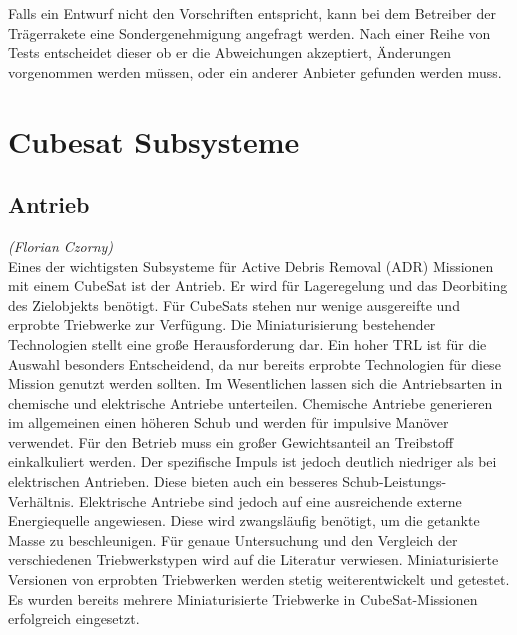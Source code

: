 		Falls ein Entwurf nicht den Vorschriften entspricht, kann bei dem Betreiber der Trägerrakete eine Sondergenehmigung angefragt werden. Nach einer Reihe von Tests entscheidet dieser ob er die Abweichungen akzeptiert, Änderungen vorgenommen werden müssen, oder ein anderer Anbieter gefunden werden muss. \cite{CaliforniaPolytechnicStateUniversity.2014} 

	\section{Cubesat Subsysteme}%
		\subsection{Antrieb}
\hfill\emph{(Florian Czorny)}\\		%

		Eines der wichtigsten Subsysteme für Active Debris Removal (ADR) Missionen mit einem CubeSat ist der Antrieb. Er wird für Lageregelung und das Deorbiting des Zielobjekts benötigt.
Für CubeSats stehen nur wenige ausgereifte und erprobte Triebwerke zur Verfügung.  Die Miniaturisierung bestehender Technologien stellt eine große Herausforderung dar. Ein hoher TRL ist für die Auswahl besonders Entscheidend, da nur bereits erprobte Technologien für diese Mission genutzt werden sollten.
Im Wesentlichen lassen sich die Antriebsarten in chemische und elektrische Antriebe unterteilen.  Chemische Antriebe generieren im allgemeinen einen höheren Schub und werden für impulsive Manöver verwendet. Für den Betrieb muss ein großer Gewichtsanteil an Treibstoff einkalkuliert werden. Der spezifische Impuls ist jedoch deutlich niedriger als bei elektrischen Antrieben. Diese bieten auch ein besseres Schub-Leistungs-Verhältnis. Elektrische Antriebe sind jedoch auf eine ausreichende externe Energiequelle angewiesen. Diese wird zwangsläufig benötigt, um die getankte Masse zu beschleunigen.
Für genaue Untersuchung und den Vergleich der verschiedenen Triebwerkstypen wird auf die Literatur \cite{Lettau.} verwiesen. Miniaturisierte Versionen von erprobten Triebwerken werden stetig weiterentwickelt und getestet. Es wurden bereits mehrere Miniaturisierte Triebwerke in CubeSat-Missionen erfolgreich eingesetzt. 
